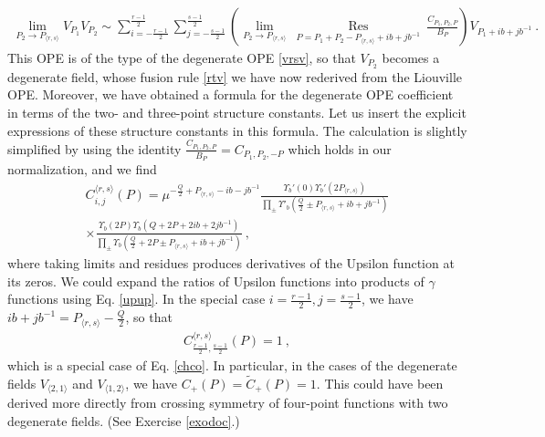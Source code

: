 \documentclass[12pt, a4paper, notitlepage, twoside]{report}
\numberwithin{equation}{section}
\theoremstyle{break}
\begin{document}
\begin{align}
\underset{P_2\to P_{\langle r,s \rangle}}{\lim} V_{P_1}V_{P_2} \sim \sum_{i=-\frac{r-1}{2}}^{\frac{r-1}{2}} \sum_{j=-\frac{s-1}{2}}^{\frac{s-1}{2}}
 \left(\underset{P_2\to P_{\langle r,s \rangle}}{\lim}\ \underset{P=P_1+P_2-P_{\langle r,s \rangle}+ib+jb^{-1}}{\operatorname{ Res}}\ \frac{C_{P_1,P_2,P}}{B_P}\right) V_{P_1 + ib+jb^{-1}}\ .
\label{crs}
\end{align}
This OPE is of the type of the degenerate OPE \eqref{vrsv}, so that $V_{P_2}$ becomes a degenerate field, whose fusion rule \eqref{rtv} we have now rederived from the Liouville OPE.
Moreover, we have obtained a formula for the degenerate OPE coefficient in terms of the two- and three-point structure constants. Let us insert the explicit expressions of these structure constants in this formula. The calculation is slightly simplified by using the identity $\frac{C_{P_1,P_2,P}}{B_P} = C_{P_1,P_2,-P}$ which holds in our normalization, and we find
\begin{multline}
 C_{i,j}^{\langle r,s \rangle}(P) = \mu^{-\frac{Q}{2}+P_{\langle r,s\rangle}-ib-jb^{-1}} 
 \frac{\Upsilon_b'(0)\Upsilon_b'(2P_{\langle r,s \rangle})}{\prod_{\pm}\Upsilon'_b(\frac{Q}{2}\pm P_{\langle r,s\rangle} +ib+jb^{-1})} 
 \\ \times 
 \frac{\Upsilon_b(2P)\Upsilon_b(Q+2P+2ib+2jb^{-1})}{\prod_\pm \Upsilon_b(\frac{Q}{2}+2P\pm P_{\langle r,s\rangle} +ib+jb^{-1})}
 \label{cijrs}
 \ ,
\end{multline}
where taking limits and residues produces derivatives of the Upsilon function at its zeros.
We could expand the ratios of Upsilon functions into products of $\gamma$ functions using Eq. \eqref{upup}.
In the special case $i=\frac{r-1}{2}, j=\frac{s-1}{2}$, we have $ib+jb^{-1} = P_{\langle r,s\rangle}-\frac{Q}{2} $, so that 
\begin{align}
 C_{\frac{r-1}{2},\frac{s-1}{2}}^{\langle r,s \rangle}(P) = 1 \ ,
 \label{cco}
\end{align}
which is a special case of Eq. \eqref{chco}.
In particular, in the cases of the degenerate fields $V_{\langle 2,1\rangle}$ and $V_{\langle 1,2\rangle}$, we have $C_+(P)=\tilde{C}_+(P)=1$. This could have been derived more directly from crossing symmetry of four-point functions with two degenerate fields. 
(See Exercise \ref{exodoc}.) 
\end{document}
